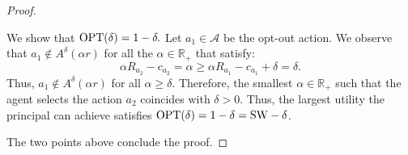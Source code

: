 \begin{proof}
\begin{enumerate}
		We show that $\textnormal{OPT}(\delta) = 1-\delta.$ 
		Let $a_1 \in \mathcal{A}$ be the opt-out action.
		We observe that $a_1 \not \in {A}^{\delta}(\alpha r)$ for all the $\alpha \in \mathbb{R}_{+}$ that satisfy:
		\begin{equation*}
			\alpha R_{a_2} - c_{a_2} = \alpha \ge \alpha R_{a_1} - c_{a_1} + \delta = \delta.
		\end{equation*}
		Thus, $a_1 \not \in {A}^{\delta}(\alpha r)$ for all $\alpha \ge \delta$.
		Therefore, the smallest $\alpha \in \mathbb{R}_{+}$ such that the agent selects the action $a_2$ coincides with $\delta > 0$.
		Thus, the largest utility the principal can achieve satisfies $\textnormal{OPT}(\delta) = 1 - \delta = \textnormal{SW} - \delta$.
	\end{enumerate}
	The two points above conclude the proof.
\end{proof}
\RealtionNonRobustThree*
